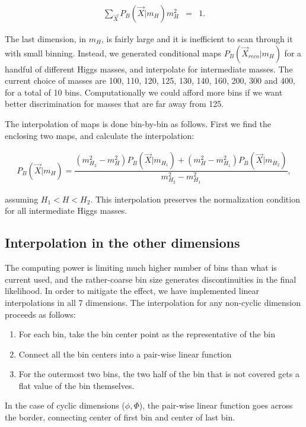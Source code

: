 \documentclass{cmspaper}
\begin{document}
\begin{eqnarray}
\sum_{\vec{X}} P_B(\vec{X} | m_H) m_H^2 &=& 1. 
\end{eqnarray}

The last dimension, in $m_H$, is fairly large and it is inefficient to
scan through it with small binning. Instead, we generated conditional 
maps $P_B(\vec{X}_{reco} | m_H)$ for a handful of different Higgs masses, 
and interpolate for intermediate masses.  
The current choice of masses are 100, 110, 120, 125, 130, 140,
160, 200, 300 and 400, for a total of 10 bins.  Computationally
we could afford more bins if we want better discrimination for masses
that are far away from 125.

The interpolation of maps is done bin-by-bin as follows.
First we find the enclosing two maps, and calculate the interpolation:

\begin{eqnarray}
P_B(\vec{X} | m_H)
   = \dfrac{(m_{H_2}^2 - m_H^2) P_B(\vec{X} | m_{H_1}) + (m_H^2 - m_{H_1}^2) P_B(\vec{X} | m_{H_2})}
      {m_{H_2}^2 - m_{H_1}^2},
\end{eqnarray}

assuming $H_1 < H < H_2$.  This interpolation preserves the normalization
condition for all intermediate Higgs masses.

\subsection{Interpolation in the other dimensions}

The computing power is limiting much higher number of bins than what is current used, and
the rather-coarse bin size generates discontinuities in the final likelihood.
In order to mitigate the effect, we have implemented linear interpolations in all
7 dimensions.  The interpolation for any non-cyclic dimension proceeds as follows:

\begin{enumerate}
\item For each bin, take the bin center point as the representative of the bin
\item Connect all the bin centers into a pair-wise linear function
\item For the outermost two bins, the two half of the bin that is not covered
gets a flat value of the bin themselves.
\end{enumerate}

In the case of cyclic dimensions ($\phi, \Phi$),
the pair-wise linear function goes across the border,
connecting center of first bin and center of last bin.
\end{document}
